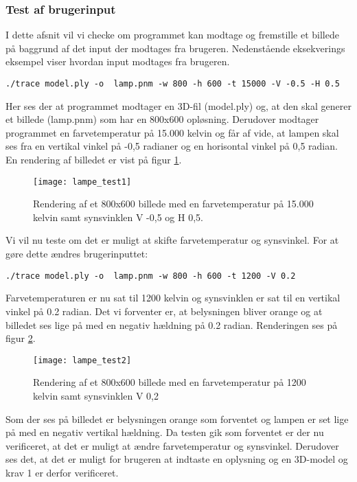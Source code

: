 \subsubsection{Test af brugerinput}

I dette afsnit vil vi checke om programmet kan modtage og fremstille et billede på baggrund af det input der modtages fra brugeren. Nedenstående eksekverings eksempel viser hvordan input modtages fra brugeren.

\begin{lstlisting}
./trace model.ply -o  lamp.pnm -w 800 -h 600 -t 15000 -V -0.5 -H 0.5
\end{lstlisting}

Her ses der at programmet modtager en 3D-fil (model.ply) og, at den skal generer et billede (lamp.pnm) som har en 800x600 opløsning. Derudover modtager programmet en farvetemperatur på 15.000 kelvin og får af vide, at lampen skal ses fra en vertikal vinkel på -0,5 radianer og en horisontal vinkel på 0,5 radian. En rendering af billedet er vist på figur \ref{fig:lampe_test1}.

\begin{figure}[H]
  \centering
  \texttt{[image: lampe\_test1]}
  \caption{Rendering af et 800x600 billede med en farvetemperatur på 15.000 kelvin samt synsvinklen V -0,5 og H 0,5.}
    \label{fig:lampe_test1}
\end{figure}

Vi vil nu teste om det er muligt at skifte farvetemperatur og synsvinkel. For at gøre dette ændres brugerinputtet:
\begin{lstlisting}
./trace model.ply -o  lamp.pnm -w 800 -h 600 -t 1200 -V 0.2
\end{lstlisting}

Farvetemperaturen er nu sat til 1200 kelvin og synsvinklen er sat til en vertikal vinkel på 0.2 radian. Det vi forventer er, at belysningen bliver orange og at billedet ses lige på med en negativ hældning på 0.2 radian. Renderingen ses på figur \ref{fig:lampe_test2}.

\begin{figure}[H]
  \centering
  \texttt{[image: lampe\_test2]}
  \caption{Rendering af et 800x600 billede med en farvetemperatur på 1200 kelvin samt synsvinklen V 0,2}
    \label{fig:lampe_test2}
\end{figure}

Som der ses på billedet er belysningen orange som forventet og lampen er set lige på med en negativ vertikal hældning. Da testen gik som forventet er der nu verificeret, at det er muligt at ændre farvetemperatur og synsvinkel. Derudover ses det, at det er muligt for brugeren at indtaste en oplysning og en 3D-model og krav 1 er derfor verificeret.

